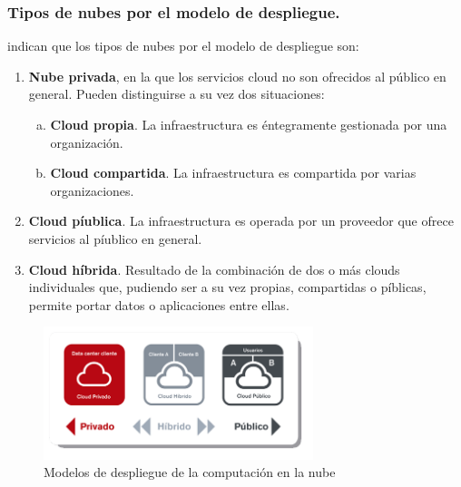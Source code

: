 \subsubsection{Tipos de nubes por el modelo de despliegue.}
\cite{nist} indican que los tipos de nubes por el modelo de despliegue son:
\begin{enumerate}
    \item \textbf{Nube privada}, en  la  que  los  servicios  cloud  no  son
          ofrecidos  al  público  en  general. Pueden distinguirse a su vez dos
          situaciones:
          \begin{enumerate}[a.]
              \item \textbf{Cloud propia}. La infraestructura es éntegramente gestionada
                    por una organización.
              \item \textbf{Cloud compartida}. La  infraestructura  es  compartida  por
                    varias organizaciones.
          \end{enumerate}
    \item \textbf{Cloud píublica}. La  infraestructura  es  operada  por  un
          proveedor  que  ofrece  servicios al píublico en general.
    \item \textbf{Cloud híbrida}. Resultado de la combinación de dos o más clouds
          individuales que, pudiendo ser a su vez propias, compartidas o píblicas,
          permite portar datos o aplicaciones entre ellas.
\end{enumerate}

\begin{figure}[h]
    \centering
    \captionsetup{justification=centering}
    \includegraphics[width=0.7\textwidth]{Imagenes/Bitmap/cloud0}
    \caption{Modelos de despliegue de la computación en la nube}
    \label{fig:cloud1}
\end{figure}

